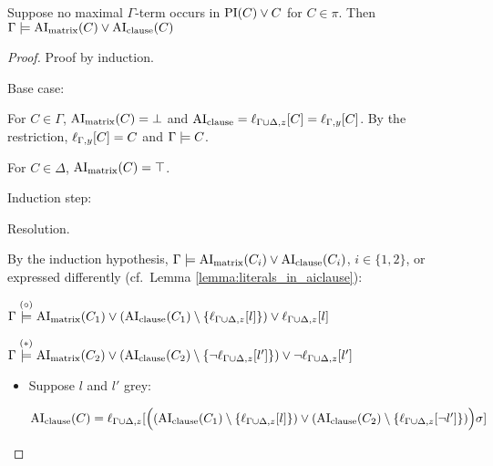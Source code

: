 \documentclass[,%
	paper=a4,%
	DIV14, 
	liststotoc,
	bibtotoc,
	draft=false,%
	numbers=noendperiod
]{scrartcl}
\begin{document}
\begin{lemma}
	Suppose no maximal $\Gamma$-term occurs in $\operatorname{PI}(C) \lor C$ for $C \in \pi$.
	Then 
	$\Gamma \models \operatorname{AI}_\mathrm{matrix}(C) \lor \operatorname{AI}_\mathrm{clause}(C)$ 
\end{lemma}
\begin{proof}


	Proof by induction.

	Base case:

	For $C \in \Gamma$, $\operatorname{AI}_\mathrm{matrix}(C) = \bot$ and $\operatorname{AI}_\mathrm{clause} = \ell_{\Gamma\cup\Delta,z}[C] = \ell_{\Gamma,y}[C] $. By the restriction, $\ell_{\Gamma,y}[C] = C$ and $\Gamma \models C$.

	For $C \in \Delta$, $\operatorname{AI}_\mathrm{matrix}(C) = \top$.

	Induction step:


	\begin{description}
		\item{Resolution.}
			\begin{prooftree}
			\end{prooftree}


			By the induction hypothesis,
			$\Gamma \models \operatorname{AI}_\mathrm{matrix}(C_i) \lor \operatorname{AI}_\mathrm{clause}(C_i)$, $i\in\{1,2\}$, or expressed differently (cf.~Lemma \ref{lemma:literals_in_aiclause}):

			$\Gamma \stackrel{(\circ)}{\models} \operatorname{AI}_\mathrm{matrix}(C_1) \lor (\operatorname{AI}_\mathrm{clause}(C_1)\setminus\{\ell_{\Gamma\cup\Delta,z}[l]\}) \lor \ell_{\Gamma\cup\Delta,z}[l]$

			$\Gamma \stackrel{(*)}{\models} \operatorname{AI}_\mathrm{matrix}(C_2) \lor (\operatorname{AI}_\mathrm{clause}(C_2)\setminus\{\lnot \ell_{\Gamma\cup\Delta,z}[l']\}) \lor \lnot \ell_{\Gamma\cup\Delta,z}[l']$

			\begin{itemize}
				\item
					Suppose $l$ and $l'$ grey:

					$\operatorname{AI}_\mathrm{clause}(C) =
					\ell_{\Gamma\cup\Delta,z}[\Big( (\operatorname{AI}_\mathrm{clause}(C_1) \setminus \{\ell_{\Gamma\cup\Delta,z}[l]\}) \lor (\operatorname{AI}_\mathrm{clause}(C_2)\setminus   \{\ell_{\Gamma\cup\Delta,z}[\lnot l']\}) \Big)\sigma]$



\end{itemize}
\end{description}
\end{proof}
\end{document}
